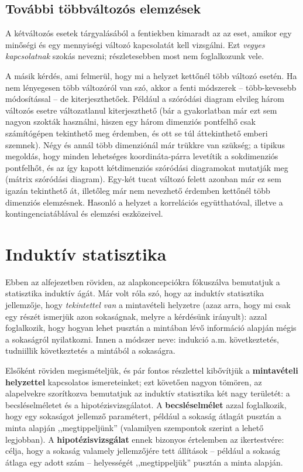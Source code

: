 \documentclass[]{book}
\begin{document}
\hypertarget{deskriptivtovabbitobbvalt}{%
\section{További többváltozós elemzések}\label{deskriptivtovabbitobbvalt}}

A kétváltozós esetek tárgyalásából a fentiekben kimaradt az az eset, amikor egy minőségi és egy mennyiségi változó kapcsolatát kell vizsgálni. Ezt \emph{vegyes kapcsolatnak} szokás nevezni; részletesebben most nem foglalkozunk vele.

A másik kérdés, ami felmerül, hogy mi a helyzet kettőnél több változó esetén. Ha nem lényegesen több változóról van szó, akkor a fenti módszerek -- több-kevesebb módosítással -- de kiterjeszthetőek. Például a szóródási diagram elvileg három változós esetre változatlanul kiterjeszthető (bár a gyakorlatban már ezt sem nagyon szokták használni, hiszen egy három dimenziós pontfelhő csak számítógépen tekinthető meg érdemben, és ott se túl áttekinthető emberi szemnek). Négy és annál több dimenziónál már trükkre van szükség; a tipikus megoldás, hogy minden lehetséges koordináta-párra levetítik a sokdimenziós pontfelhőt, és az így kapott kétdimenziós szóródási diagramokat mutatják meg (mátrix szóródási diagram). Egy-két tucat változó felett azonban már ez sem igazán tekinthető át, illetőleg már nem nevezhető érdemben kettőnél több dimenziós elemzésnek. Hasonló a helyzet a korrelációs együtthatóval, illetve a kontingenciatáblával és elemzési eszközeivel.

\hypertarget{induktiv}{%
\chapter{Induktív statisztika}\label{induktiv}}

Ebben az alfejezetben röviden, az alapkoncepciókra fókuszálva bemutatjuk a statisztika induktív ágát. Már volt róla szó, hogy az induktív statisztika jellemzője, hogy \emph{tekintettel van} a mintavételi helyzetre (azaz arra, hogy mi csak egy részét ismerjük azon sokaságnak, melyre a kérdésünk irányult): azzal foglalkozik, hogy hogyan lehet pusztán a mintában lévő információ alapján mégis a sokaságról nyilatkozni. Innen a módszer neve: indukció a.m. következtetés, tudniillik következtetés a mintából a sokaságra.

Elsőként röviden megismételjük, és pár fontos részlettel kibővítjük a \textbf{mintavételi helyzettel} kapcsolatos ismereteinket; ezt követően nagyon tömören, az alapelvekre szorítkozva bemutatjuk az induktív statisztika két nagy területét: a becsléselméletet és a hipotézisvizsgálatot. A \textbf{becsléselmélet} azzal foglalkozik, hogy egy sokaságot jellemző paramétert, például a sokaság átlagát pusztán a minta alapján ,,megtippeljünk'' (valamilyen szempontok szerint a lehető legjobban). A \textbf{hipotézisvizsgálat} ennek bizonyos értelemben az ikertestvére: célja, hogy a sokaság valamely jellemzőjére tett állítások -- például a sokaság átlaga egy adott szám -- helyességét ,,megtippeljük'' pusztán a minta alapján.
\end{document}

